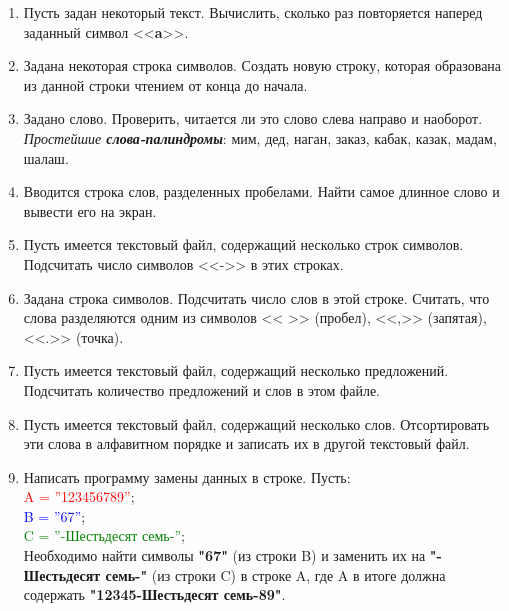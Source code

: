 \begin{enumerate}[leftmargin=*]
\begin{lstlisting}
            unsigned int pos str=str.find(symbol');
            if ((pos>=0') && pos(<str.length(')')')
                    cout << "@\color{Blue}Номер первого вхождения символа@ ("
                         << symbol << "') @\color{Blue}в строке@ \n\n("
                         << str << "')\n\n @\color{Blue}равен@: "<< pos << endl;
            else cout << "@\color{Blue}Такого символа в строке нет@!\n";
            return 0;
        }
    \end{lstlisting}
    \item Пусть задан некоторый текст. Вычислить, сколько раз повторяется наперед заданный символ <<\textbf{a}>>.
    \item Задана некоторая строка символов. Создать новую строку, которая образована из данной строки чтением от конца до начала.
    \item Задано слово. Проверить, читается ли это слово слева направо и наоборот. \textit{Простейшие \textbf{слова-палиндромы}}: мим, дед, наган, заказ, кабак, казак, мадам, шалаш.
    \item Вводится строка слов, разделенных пробелами. Найти самое длинное слово и вывести его на экран. 
    \item Пусть имеется текстовый файл, содержащий несколько строк символов. Подсчитать число символов <<->> в этих строках.
    \item Задана строка символов. Подсчитать число слов в этой строке. Считать, что слова разделяются одним из символов << >> (пробел), <<,>> (запятая), <<.>> (точка).
    \item Пусть имеется текстовый файл, содержащий несколько предложений. Подсчитать количество предложений и слов в этом файле.
    \item Пусть имеется текстовый файл, содержащий несколько слов. Отсортировать эти слова в алфавитном порядке и записать их в другой текстовый файл.
    \item Написать программу замены данных в строке. Пусть:\\ \textcolor{Red}{A = ''123456789''};\\
    \textcolor{Blue}{B = ''67''};\\
    \textcolor{Green}{C = ''-Шестьдесят семь-''};\\
    Необходимо найти символы \textbf{"67"} (из строки B) и заменить их на \textbf{"-Шестьдесят семь-"} (из строки C) в строке A, где A в итоге должна содержать \textbf{"12345-Шестьдесят семь-89"}.
\end{enumerate}
